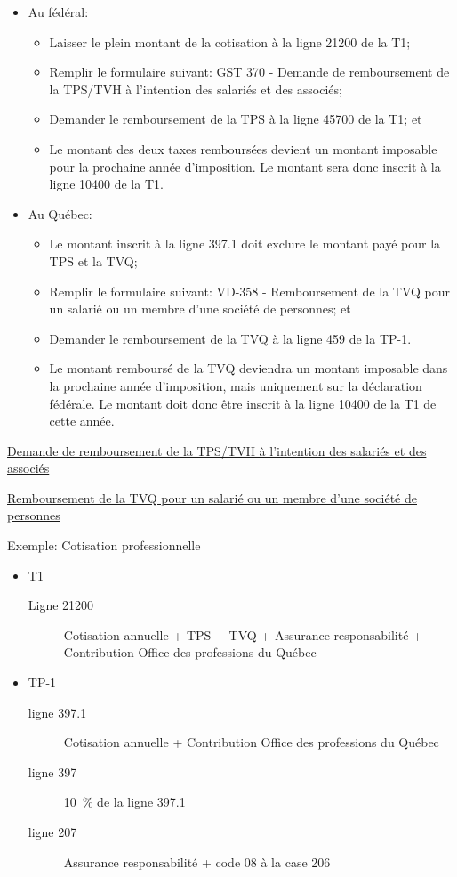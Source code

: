 \begin{itemize}
	\item Au fédéral:
	\begin{itemize}
		\item Laisser le plein montant de la cotisation à la ligne 21200 de la T1;
		\item Remplir le formulaire suivant: GST 370 - Demande de remboursement de la TPS/TVH à l'intention des salariés et des associés;
		\item Demander le remboursement de la TPS à la ligne 45700 de la T1; et
		\item Le montant des deux taxes remboursées devient un montant imposable pour la prochaine année d'imposition. Le montant sera donc inscrit à la ligne 10400 de la T1.
	\end{itemize}
	\item Au Québec:
	\begin{itemize}
		\item Le montant inscrit à la ligne 397.1 doit exclure le montant payé pour la TPS et la TVQ;
		\item Remplir le formulaire suivant: VD-358 - Remboursement de la TVQ pour un salarié ou un membre d'une société de personnes; et
		\item Demander le remboursement de la TVQ à la ligne 459 de la TP-1.
		\item Le montant remboursé de la TVQ deviendra un montant imposable dans la prochaine année d'imposition, mais uniquement sur la déclaration fédérale. Le montant doit donc être inscrit à la ligne 10400 de la T1 de cette année.
	\end{itemize}
\end{itemize}

\href{https://www.canada.ca/content/dam/cra-arc/formspubs/pbg/gst370/gst370-22f.pdf}{Demande de remboursement de la TPS/TVH à l'intention des salariés et des associés}

\href{https://www.revenuquebec.ca/fr/services-en-ligne/formulaires-et-publications/details-courant/vd-358/}{Remboursement de la TVQ pour un salarié ou un membre d'une société de personnes}

Exemple: Cotisation professionnelle
\begin{itemize}
	\item T1
	\begin{description}
		\item[Ligne 21200] Cotisation annuelle + TPS + TVQ + Assurance responsabilité + Contribution Office des professions du Québec
	\end{description}
	\item TP-1
	\begin{description}
		\item[ligne 397.1] Cotisation annuelle + Contribution Office des professions du Québec
		\item[ligne 397] 10~\% de la ligne 397.1
		\item[ligne 207]  Assurance responsabilité + code 08 à la case 206
	\end{description}
\end{itemize}



